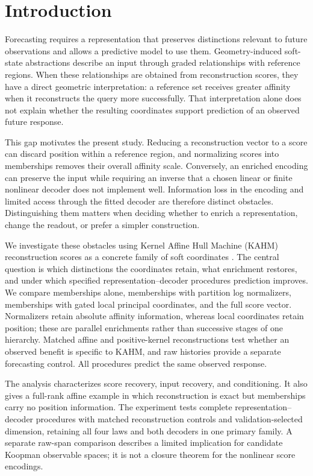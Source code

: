 \section{Introduction}
Forecasting requires a representation that preserves distinctions relevant to future observations and allows a predictive model to use them. Geometry-induced soft-state abstractions describe an input through graded relationships with reference regions. When these relationships are obtained from reconstruction scores, they have a direct geometric interpretation: a reference set receives greater affinity when it reconstructs the query more successfully. That interpretation alone does not explain whether the resulting coordinates support prediction of an observed future response.

This gap motivates the present study. Reducing a reconstruction vector to a score can discard position within a reference region, and normalizing scores into memberships removes their overall affinity scale. Conversely, an enriched encoding can preserve the input while requiring an inverse that a chosen linear or finite nonlinear decoder does not implement well. Information loss in the encoding and limited access through the fitted decoder are therefore distinct obstacles. Distinguishing them matters when deciding whether to enrich a representation, change the readout, or prefer a simpler construction.

We investigate these obstacles using Kernel Affine Hull Machine (KAHM) reconstruction scores as a concrete family of soft coordinates \citep{Kumar2024KAHM,Kumar2025Collaborative,KumarKargaran2026Limits}. The central question is which distinctions the coordinates retain, what enrichment restores, and under which specified representation--decoder procedures prediction improves. We compare memberships alone, memberships with partition log normalizers, memberships with gated local principal coordinates, and the full score vector. Normalizers retain absolute affinity information, whereas local coordinates retain position; these are parallel enrichments rather than successive stages of one hierarchy. Matched affine and positive-kernel reconstructions test whether an observed benefit is specific to KAHM, and raw histories provide a separate forecasting control. All procedures predict the same observed response.

The analysis characterizes score recovery, input recovery, and conditioning. It also gives a full-rank affine example in which reconstruction is exact but memberships carry no position information. The experiment tests complete representation--decoder procedures with matched reconstruction controls and validation-selected dimension, retaining all four laws and both decoders in one primary family. A separate raw-span comparison describes a limited implication for candidate Koopman observable spaces; it is not a closure theorem for the nonlinear score encodings.

